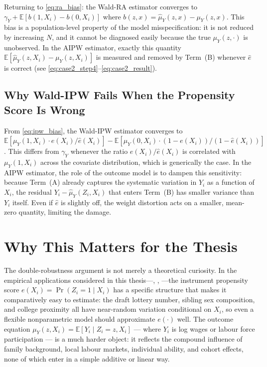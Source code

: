 \documentclass[12pt,a4paper]{article}
\theoremstyle{remark}
\newcommand{\E}{\mathbb{E}}
\newcommand{\muY}{\mu_Y}
\newcommand{\muYhat}{\hat{\mu}_Y}
\newcommand{\ehat}{\hat{e}}
\begin{document}
Returning to \eqref{eq:ra_bias}: the Wald-RA estimator converges to
$\gamma_Y + \E[b(1,X_i) - b(0,X_i)]$ where $b(z,x) = \muYhat(z,x) - \muY(z,x)$.
This bias is a population-level property of the model misspecification: it is not
reduced by increasing $N$, and it cannot be diagnosed easily because the true
$\muY(z,\cdot)$ is unobserved. In the AIPW estimator, exactly this quantity
$\E[\muYhat(z,X_i) - \muY(z,X_i)]$ is measured and removed by Term~(B) whenever
$\ehat$ is correct (see \eqref{eq:case2_step4}--\eqref{eq:case2_result}).

\subsection{Why Wald-IPW Fails When the Propensity Score Is Wrong}
\label{subsec:ipw_failure}

From \eqref{eq:ipw_bias}, the Wald-IPW estimator converges to
$\E[\muY(1,X_i) \cdot e(X_i)/\ehat(X_i)] - \E[\muY(0,X_i) \cdot (1-e(X_i))/(1-\ehat(X_i))]$.
This differs from $\gamma_Y$ whenever the ratio $e(X_i)/\ehat(X_i)$ is correlated
with $\muY(1,X_i)$ across the covariate distribution, which is generically the case.
In the AIPW estimator, the role of the outcome model is to dampen this sensitivity:
because Term~(A) already captures the systematic variation in $Y_i$ as a function of
$X_i$, the residual $Y_i - \muYhat(Z_i,X_i)$ that enters Term~(B) has smaller
variance than $Y_i$ itself. Even if $\ehat$ is slightly off, the weight distortion
acts on a smaller, mean-zero quantity, limiting the damage.

\section{Why This Matters for the Thesis}
\label{sec:thesis_relevance}

The double-robustness argument is not merely a theoretical curiosity. In the empirical
applications considered in this thesis---\citet{angrist1990lifetime},
\citet{card1995using}, \citet{angrist1998children}---the instrument propensity score
$e(X_i) = \Pr(Z_i=1 \mid X_i)$ has a specific structure that makes it comparatively
easy to estimate: the draft lottery number, sibling sex composition, and college
proximity all have near-random variation conditional on $X_i$, so even a flexible
nonparametric model should approximate $e(\cdot)$ well. The outcome equation
$\muY(z,X_i) = \E[Y_i \mid Z_i=z, X_i]$ --- where $Y_i$ is log wages or labour force
participation --- is a much harder object: it reflects the compound influence of family
background, local labour markets, individual ability, and cohort effects, none of which
enter in a simple additive or linear way.
\end{document}
